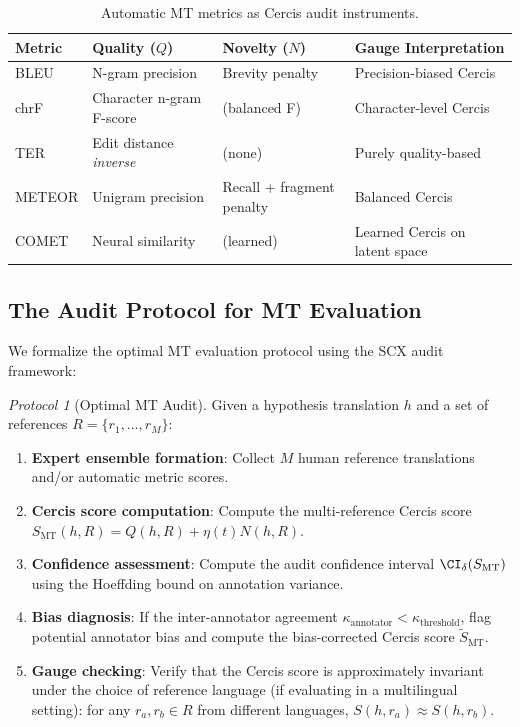 \documentclass[12pt,a4paper]{article}
\theoremstyle{remark}
\newtheorem{protocol}[theorem]{Protocol}
\newcommand{\SCX}{\textsf{SCX}}
\newcommand{\Cercis}{\textsf{Cercis}}
\begin{document}
\begin{table}[H]
\centering
\caption{Automatic MT metrics as \Cercis{} audit instruments.}
\label{tab:metrics}
\begin{tabular}{@{}llll@{}}
\toprule
\textbf{Metric} & \textbf{Quality ($Q$)} & \textbf{Novelty ($N$)} & \textbf{Gauge Interpretation} \\
\midrule
BLEU & N-gram precision & Brevity penalty & Precision-biased Cercis \\
chrF & Character n-gram F-score & (balanced F) & Character-level Cercis \\
TER & Edit distance \emph{inverse} & (none) & Purely quality-based \\
METEOR & Unigram precision & Recall + fragment penalty & Balanced Cercis \\
COMET & Neural similarity & (learned) & Learned Cercis on latent space \\
\bottomrule
\end{tabular}
\end{table}

\subsection{The Audit Protocol for MT Evaluation}

We formalize the optimal MT evaluation protocol using the \SCX{}
audit framework:

\begin{protocol}[Optimal MT Audit]
\label{proto:mt_audit}
Given a hypothesis translation $h$ and a set of references $R = \{r_1, \ldots, r_M\}$:
\begin{enumerate}[leftmargin=*, label=\textbf{Step \arabic*:}]
  \item \textbf{Expert ensemble formation}: Collect $M$ human reference
        translations and/or automatic metric scores.
  \item \textbf{Cercis score computation}: Compute the multi-reference
        \Cercis{} score $S_{\text{MT}}(h, R) = Q(h, R) + \eta(t) N(h, R)$.
  \item \textbf{Confidence assessment}: Compute the audit confidence
        interval $\CI_{\delta}(S_{\text{MT}})$ using the Hoeffding bound
        on annotation variance.
  \item \textbf{Bias diagnosis}: If the inter-annotator agreement
        $\kappa_{\text{annotator}} < \kappa_{\text{threshold}}$, flag
        potential annotator bias and compute the bias-corrected
        \Cercis{} score $\tilde{S}_{\text{MT}}$.
  \item \textbf{Gauge checking}: Verify that the \Cercis{} score is
        approximately invariant under the choice of reference language
        (if evaluating in a multilingual setting): for any $r_a, r_b \in R$
        from different languages, $S(h, r_a) \approx S(h, r_b)$.
\end{enumerate}
\end{protocol}
\end{document}
